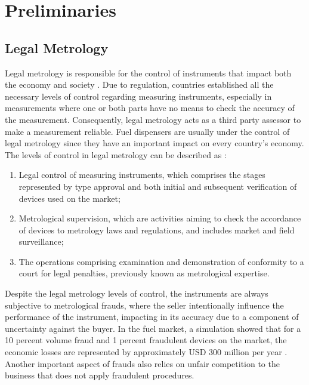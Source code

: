 \documentclass[sigplan]{acmart}
\begin{document}
\section{Preliminaries}

\subsection{Legal Metrology}

Legal metrology is responsible for the control of instruments that impact both the economy and society \cite{RodriguesFilho2015}.
Due to regulation, countries established all the necessary levels of control regarding measuring instruments, especially in measurements where one or both parts have no means to check the accuracy of the measurement. 
Consequently, legal metrology acts as a third party assessor to make a measurement reliable.
Fuel dispensers are usually under the control of legal metrology since they have an important impact on every country's economy. The levels of control in legal metrology can be described as \cite{VIM2012}:

\begin{enumerate}
 \item Legal control of measuring instruments, which comprises the stages represented by type approval and both initial and subsequent verification of devices used on the market;
 \item Metrological supervision, which are activities aiming to check the accordance of devices to metrology laws and regulations, and includes market and field surveillance;
 \item The operations comprising examination and demonstration of conformity to a court for legal penalties, previously known as metrological expertise.
\end{enumerate}

Despite the legal metrology levels of control, the instruments are always subjective to metrological frauds, where the seller intentionally influence the performance of the instrument,  impacting in its accuracy due to a component of uncertainty against the buyer. 
In the fuel market, a simulation showed that for a 10 percent volume fraud and 1 percent fraudulent devices on the market, the economic losses are represented by approximately USD 300 million per year \citep{RodriguesFilho2016}. 
Another important aspect of frauds also relies on unfair competition to the business that does not apply fraudulent procedures.
\end{document}
